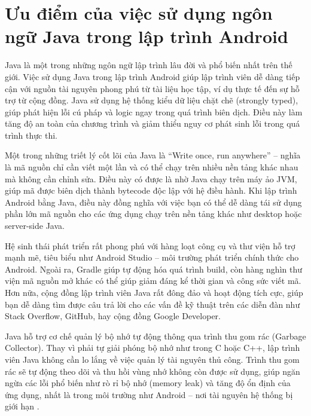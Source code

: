 \section{Ưu điểm của việc sử dụng ngôn ngữ Java trong lập trình Android}
        Java là một trong những ngôn ngữ lập trình lâu đời và phổ biến nhất trên thế giới. Việc sử dụng Java trong lập trình Android giúp lập trình viên dễ dàng tiếp cận với nguồn tài nguyên phong phú từ tài liệu học tập, ví dụ thực tế đến sự hỗ trợ từ cộng đồng. Java sử dụng hệ thống kiểu dữ liệu chặt chẽ (strongly typed), giúp phát hiện lỗi cú pháp và logic ngay trong quá trình biên dịch. Điều này làm tăng độ an toàn của chương trình và giảm thiểu nguy cơ phát sinh lỗi trong quá trình thực thi.

        \vspace{0.5em}

        Một trong những triết lý cốt lõi của Java là “Write once, run anywhere” – nghĩa là mã nguồn chỉ cần viết một lần và có thể chạy trên nhiều nền tảng khác nhau mà không cần chỉnh sửa. Điều này có được là nhờ Java chạy trên máy ảo JVM, giúp mã được biên dịch thành bytecode độc lập với hệ điều hành. Khi lập trình Android bằng Java, điều này đồng nghĩa với việc bạn có thể dễ dàng tái sử dụng phần lớn mã nguồn cho các ứng dụng chạy trên nền tảng khác như desktop hoặc server-side Java.

        \vspace{0.5em}

        Hệ sinh thái phát triển rất phong phú với hàng loạt công cụ và thư viện hỗ trợ mạnh mẽ, tiêu biểu như Android Studio – môi trường phát triển chính thức cho Android. Ngoài ra, Gradle giúp tự động hóa quá trình build, còn hàng nghìn thư viện mã nguồn mở khác có thể giúp giảm đáng kể thời gian và công sức viết mã. Hơn nữa, cộng đồng lập trình viên Java rất đông đảo và hoạt động tích cực, giúp bạn dễ dàng tìm được câu trả lời cho các vấn đề kỹ thuật trên các diễn đàn như Stack Overflow, GitHub, hay cộng đồng Google Developer.

        \vspace{0.5em}

        Java hỗ trợ cơ chế quản lý bộ nhớ tự động thông qua trình thu gom rác (Garbage Collector). Thay vì phải tự giải phóng bộ nhớ như trong C hoặc C++, lập trình viên Java không cần lo lắng về việc quản lý tài nguyên thủ công. Trình thu gom rác sẽ tự động theo dõi và thu hồi vùng nhớ không còn được sử dụng, giúp ngăn ngừa các lỗi phổ biến như rò rỉ bộ nhớ (memory leak) và tăng độ ổn định của ứng dụng, nhất là trong môi trường như Android – nơi tài nguyên hệ thống bị giới hạn \cite{java-tutorial}.
    
